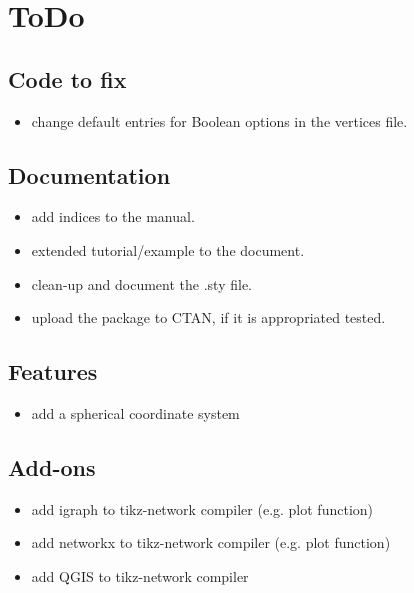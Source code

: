 \documentclass[a4paper,twosided,notoc]{tufte-book}
\begin{document}
\appendix
\chapter{ToDo}
\label{chap:todo}

\section{Code to fix}
\begin{itemize}
\item change default entries for Boolean options in the vertices file.
\end{itemize}

\section{Documentation}
\begin{itemize}
\item add indices to the manual.
\item extended tutorial/example to the document.
\item clean-up and document the .sty file.
\item upload the package to CTAN, if it is appropriated tested.
\end{itemize}

\section{Features}
\begin{itemize}
\item add a spherical coordinate system
\end{itemize}

\section{Add-ons}
\begin{itemize}
\item add igraph to tikz-network compiler (e.g. plot function)
\item add networkx to tikz-network compiler (e.g. plot function)
\item add QGIS to tikz-network compiler
\end{itemize}










\backmatter





\printindex
\end{document}
